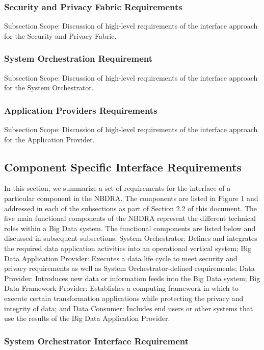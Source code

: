 \documentclass[9pt,twocolumn]{styles/osajnl}
\begin{document}
\subsubsection{Security and Privacy Fabric Requirements}

Subsection Scope: Discussion of high-level requirements of the interface approach for the Security and Privacy Fabric.

\subsubsection{System Orchestration Requirement}

Subsection Scope: Discussion of high-level requirements of the interface approach for the System Orchestrator.

\subsubsection{Application Providers Requirements}

Subsection Scope: Discussion of high-level requirements of the interface approach for the Application Provider.

\subsection{Component Specific Interface Requirements}

In this section, we summarize a set of requirements for the interface of a particular component in the NBDRA. The components are listed in Figure 1 and addressed in each of the subsections as part of Section 2.2 of this document. The five main functional components of the NBDRA represent the different technical roles within a Big Data system. The functional components are listed below and discussed in subsequent subsections.
System Orchestrator: Defines and integrates the required data application activities into an operational vertical system;
Big Data Application Provider: Executes a data life cycle to meet security and privacy requirements as well as System Orchestrator-defined requirements;
Data Provider: Introduces new data or information feeds into the Big Data system;
Big Data Framework Provider: Establishes a computing framework in which to execute certain transformation applications while protecting the privacy and integrity of data; and
Data Consumer: Includes end users or other systems that use the results of the Big Data Application Provider.

\subsubsection{System Orchestrator Interface Requirement}
\end{document}
